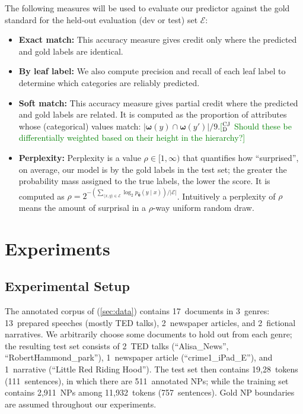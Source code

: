 \documentclass[11pt,letterpaper]{article}
\newcommand{\ensuretext}[1]{#1}
\newcommand{\cjdmarker}{\ensuretext{\textcolor{green}{\ensuremath{^{\textsc{CJ}}_{\textsc{D}}}}}}
\newcommand{\nssmarker}{\ensuretext{\textcolor{magenta}{\ensuremath{^{\textsc{NS}}_{\textsc{S}}}}}}
\newcommand{\arkcomment}[3]{\ensuretext{\textcolor{#3}{[#1 #2]}}}
\newcommand{\cjd}[1]{\arkcomment{\cjdmarker}{#1}{green}}
\newcommand{\nss}[1]{\arkcomment{\nssmarker}{#1}{magenta}}
\newcommand{\costversion}[1]{}
\begin{document}
The following measures will be used to evaluate our predictor against the gold standard 
for the held-out evaluation (dev or test) set $\mathcal{E}$:
\begin{itemize}
  \item \textbf{Exact match:} This accuracy measure gives credit only where the predicted and gold labels 
  are identical.\costversion{\nss{} When the model is allowed to predict internal labels, we will report 
  overall precision and recall of leaf labels. Otherwise, we report accuracy.}
  \item \textbf{By leaf label:} We also compute precision and recall of each leaf label 
  to determine which categories are reliably predicted.
  \item \textbf{Soft match:} This accuracy measure gives partial credit where the predicted and gold labels 
  are related. It is computed as the proportion of attributes whose (categorical) values match: 
  $|\boldsymbol{\omega}(y) \cap \boldsymbol{\omega}(y')|/9$.\cjd{Should these be differentially weighted based on their height in the hierarchy?}
  \item \textbf{Perplexity:} Perplexity is a value $\rho \in [1,\infty)$ that quantifies how ``surprised'', on average, our model is by the gold labels 
  in the test set; the greater the probability mass assigned to the true labels, 
  the lower the score. 
  It is computed as $\rho = 2^{-\left(\sum_{\langle x, y \rangle \in \mathcal{E}} \log_2 p_{\hat{\boldsymbol{\theta}}}(y \mid x)\right) / |\mathcal{E}|}$. Intuitively a perplexity of $\rho$ means the amount of surprisal in a $\rho$-way uniform random draw.
\end{itemize}

\section{Experiments}\label{sec:exp}

\subsection{Experimental Setup}

The annotated corpus of \citet{bhatia14} (\cref{sec:data}) contains 17~documents 
in 3~genres: 13~prepared speeches (mostly TED talks), 2~newspaper articles, 
and 2~fictional narratives. We arbitrarily choose some documents to hold out from each genre; 
the resulting test set consists of 2~TED talks (``Alisa\_News'', ``RobertHammond\_park''), 
1~newspaper article (``crime1\_iPad\_E''), and 1~narrative (``Little Red Riding Hood'').
The test set then contains 19,28~tokens (111~sentences), in which there are 511~annotated NPs; 
while the training set contains 2,911~NPs among 11,932~tokens (757~sentences).
Gold NP boundaries are assumed throughout our experiments.
\end{document}
